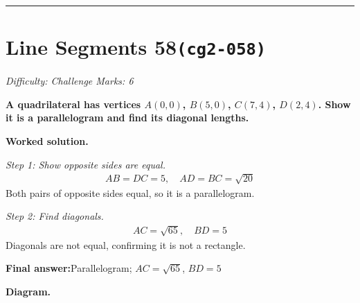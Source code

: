 \documentclass[11pt]{article}
\newcommand{\question}[1]{\par\medskip\noindent\textbf{#1}\par}
\begin{document}
\medskip\hrule

\section*{Line Segments 58\quad\small\texttt{(cg2-058)}}
\textit{Difficulty: Challenge \quad\textbar\quad Marks: 6}

\question{A quadrilateral has vertices \( A(0, 0) \), \( B(5, 0) \), \( C(7, 4) \), \( D(2, 4) \). Show it is a parallelogram and find its diagonal lengths.}

\textbf{Worked solution.}

\textit{Step 1: Show opposite sides are equal.}
\[\begin{gathered}
AB = DC = 5, \quad AD = BC = \sqrt{20}
\end{gathered}\]
Both pairs of opposite sides equal, so it is a parallelogram.

\textit{Step 2: Find diagonals.}
\[\begin{gathered}
AC = \sqrt{65}, \quad BD = 5
\end{gathered}\]
Diagonals are not equal, confirming it is not a rectangle.

\begin{answerbox}
\textbf{Final answer:}\quad Parallelogram; \(\displaystyle AC = \sqrt{65}\), \(\displaystyle BD = 5\)
\end{answerbox}
\textbf{Diagram.}
\end{document}
